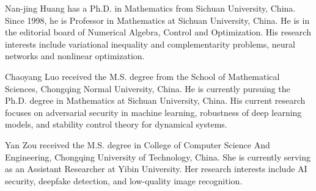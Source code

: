 \documentclass[journal]{IEEEtran}
\begin{document}


\begin{IEEEbiographynophoto}{Nan-jing Huang }
	 has a Ph.D. in Mathematics from Sichuan University, China.  Since 1998,  he is Professor in Mathematics at Sichuan University, China.  He is in the editorial board of Numerical Algebra, Control and Optimization. His research interests include variational inequality and complementarity problems, neural networks and nonlinear optimization.
\end{IEEEbiographynophoto}

\begin{IEEEbiographynophoto}{Chaoyang Luo}
	received the M.S. degree from the School of Mathematical Sciences, Chongqing Normal University, China. He is currently pursuing the Ph.D. degree in Mathematics at Sichuan University, China. His current research focuses on adversarial security in machine learning, robustness of deep learning models, and stability control theory for dynamical systems.
\end{IEEEbiographynophoto}
\begin{IEEEbiographynophoto}{Yan Zou}
	received the M.S. degree in College of Computer Science And Engineering, Chongqing University of Technology, China. She is currently serving as an Assistant Researcher	at Yibin University. Her research interests include AI security, 
	deepfake detection, and low-quality image recognition.
\end{IEEEbiographynophoto}
\end{document}
